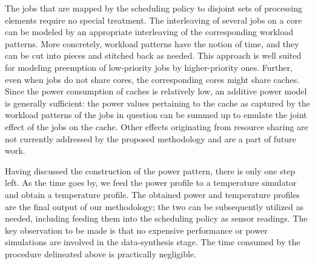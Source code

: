 The jobs that are mapped by the scheduling policy to disjoint sets of processing
elements require no special treatment. The interleaving of several jobs on a
core can be modeled by an appropriate interleaving of the corresponding workload
patterns. More concretely, workload patterns have the notion of time, and they
can be cut into pieces and stitched back as needed. This approach is well suited
for modeling preemption of low-priority jobs by higher-priority ones. Further,
even when jobs do not share cores, the corresponding cores might share caches.
Since the power consumption of caches is relatively low, an additive power model
is generally sufficient: the power values pertaining to the cache as captured by
the workload patterns of the jobs in question can be summed up to emulate the
joint effect of the jobs on the cache. Other effects originating from resource
sharing are not currently addressed by the proposed methodology and are a part
of future work.

Having discussed the construction of the power pattern, there is only one step
left. As the time goes by, we feed the power profile to a temperature simulator
and obtain a temperature profile. The obtained power and temperature profiles
are the final output of our methodology; the two can be subsequently utilized as
needed, including feeding them into the scheduling policy as sensor readings.
The key observation to be made is that no expensive performance or power
simulations are involved in the data-synthesis stage. The time consumed by the
procedure delineated above is practically negligible.
